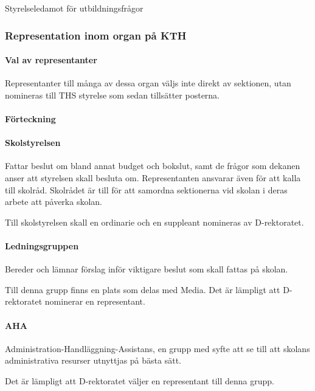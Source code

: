\documentclass[a4paper,12pt]{article}
\begin{document}
Styrelseledamot för utbildningsfrågor

\subsubsection{Representation inom organ på KTH}

\paragraph{Val av representanter}

Representanter till många av dessa organ väljs inte direkt av sektionen, utan nomineras till THS styrelse som sedan tillsätter posterna.

\paragraph{Förteckning}

\paragraph{Skolstyrelsen}

Fattar beslut om bland annat budget och bokslut, samt de frågor som dekanen anser att styrelsen skall besluta om. Representanten ansvarar även för att kalla till skolråd. Skolrådet är till för att samordna sektionerna vid skolan i deras arbete att påverka skolan.

Till skolstyrelsen skall en ordinarie och en suppleant nomineras av D-rektoratet.

\paragraph{Ledningsgruppen}

Bereder och lämnar förslag inför viktigare beslut som skall fattas på skolan.

Till denna grupp finns en plats som delas med Media. Det är lämpligt att D-rektoratet nominerar en representant.

\paragraph{AHA}

Administration-Handläggning-Assistans, en grupp med syfte att se till att skolans administrativa resurser utnyttjas på bästa sätt.

Det är lämpligt att D-rektoratet väljer en representant till denna grupp.
\end{document}
